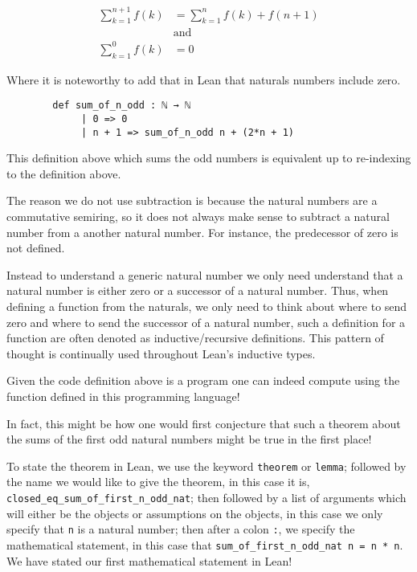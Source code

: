 \begin{example}
    \begin{align*}
        \sum_{k = 1}^{n + 1} f(k) &= \sum_{k = 1}^{n} f(k) + f(n + 1) \tag{for $n \geq 0$}\\
            &\text{and}\\
        \sum_{k = 1}^{0} f(k) &= 0
    \end{align*}

    Where it is noteworthy to add that in Lean that naturals numbers include zero.
\begin{footnotesize}
\begin{verbatim}
        def sum_of_n_odd : ℕ → ℕ
             | 0 => 0
             | n + 1 => sum_of_n_odd n + (2*n + 1)
\end{verbatim}
\end{footnotesize}

    This definition above which sums the odd numbers is equivalent up to re-indexing to the definition above. 
    
    The reason we do not use subtraction is because the natural numbers are a commutative semiring, so 
    it does not always make sense to subtract a natural number from a another natural number. For instance, the predecessor of
    zero is not defined. 
    
    Instead to understand a generic natural number we only need understand that a natural number is either zero or a successor of a natural number.
    Thus, when defining a function from the naturals,
    we only need to think about where to send zero and where to send the successor of a natural number, such a definition for a function
    are often denoted as inductive/recursive definitions. This pattern of thought is continually used throughout Lean's inductive types.

    Given the code definition above is a program one can indeed compute using the
    function defined in this programming language!

    In fact, this might be how one would first conjecture that such a theorem about 
    the sums of the first odd natural numbers might be true in the first place!

    To state the theorem in Lean, we use the keyword \texttt{theorem} or \texttt{lemma};
    followed by the name we would like to give the theorem, in this case it is, \texttt{closed\_eq\_sum\_of\_first\_n\_odd\_nat};
    then followed by a list of arguments which will either be the objects or assumptions on the objects, in this case we only
    specify that \texttt{n} is a natural number; then after a colon \texttt{:}, we specify the mathematical statement,
    in this case that \texttt{sum\_of\_first\_n\_odd\_nat n = n * n}. We have stated our first mathematical statement in Lean!


\end{example}
